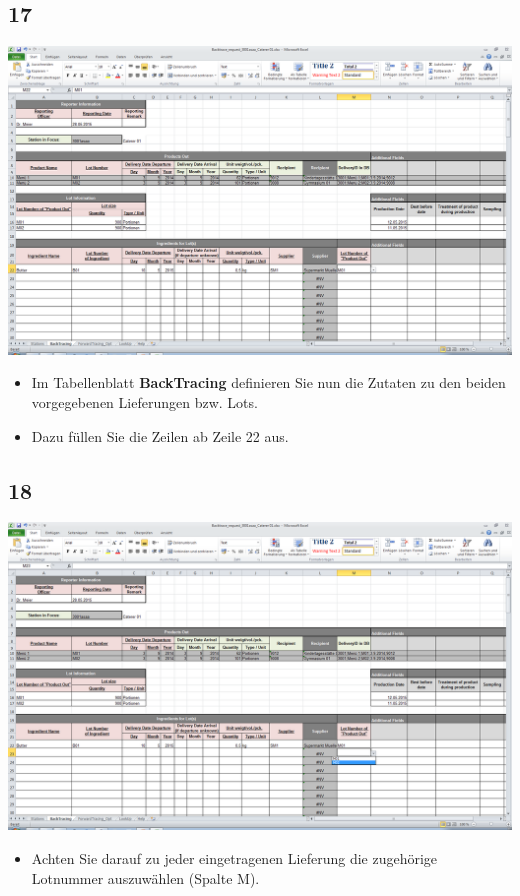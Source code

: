 \documentclass{beamer}
\begin{document}
\subsection{17}
\begin{frame}
	\begin{center}
  		\includegraphics[height=0.6\textheight]{17.png}
	\end{center}
	\begin{itemize}
		\item Im Tabellenblatt \textbf{BackTracing} definieren Sie nun die Zutaten zu den beiden vorgegebenen Lieferungen bzw. Lots.
		\item Dazu füllen Sie die Zeilen ab Zeile 22 aus.
	\end{itemize}
\end{frame}

\subsection{18}
\begin{frame}
	\begin{center}
  		\includegraphics[height=0.6\textheight]{18.png}
	\end{center}
	\begin{itemize}
		\item Achten Sie darauf zu jeder eingetragenen Lieferung die zugehörige Lotnummer auszuwählen (Spalte M).
	\end{itemize}
\end{frame}
\end{document}
